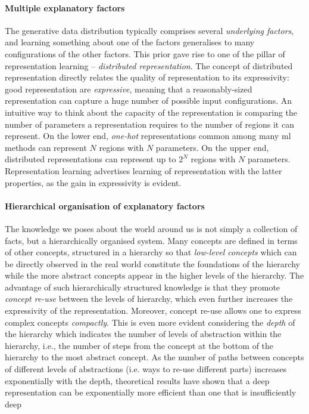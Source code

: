 \paragraph{\textbf{Multiple explanatory factors}} 
The generative data distribution typically comprises several \textit{underlying factors}, and learning something about one of the factors generalises to many configurations of the other factors.
This prior gave rise to one of the pillar of representation learning -- \textit{distributed representation}.
The concept of distributed representation directly relates the quality of representation to its expressivity: good representation are \textit{expressive}, meaning that a reasonably-sized representation can capture a huge number of possible input configurations.
An intuitive way to think about the capacity of the representation is comparing the number of parameters a representation requires to the number of regions it can represent.
On the lower end, \textit{one-hot} representations common among many \gls{ml} methods can represent $N$ regions with $N$ parameters.
On the upper end, distributed representations can represent up to $2^N$ regions with $N$ parameters.
Representation learning advertises learning of representation with the latter properties, as the gain in expressivity is evident.



\paragraph{\textbf{Hierarchical organisation of explanatory factors}}
The knowledge we poses about the world around us is not simply a collection of facts, but a hierarchically organised system.
Many concepts are defined in terms of other concepts, structured in a hierarchy so that \textit{low-level concepts} which can be directly observed in the real world constitute the foundations of the hierarchy while the more abstract concepts appear in the higher levels of the hierarchy.
The advantage of such hierarchically structured knowledge is that they promote \textit{concept re-use} between the levels of hierarchy, which even further increases the expressivity of the representation.
Moreover, concept re-use allows one to express complex concepts \textit{compactly}.
This is even more evident considering the \textit{depth} of the hierarchy which indicates the number of levels of abstraction within the hierarchy, i.e., the number of steps from the concept at the bottom of the hierarchy to the most abstract concept.
As the number of paths between concepts of different levels of abstractions (i.e. ways to re-use different parts) increases exponentially with the depth, theoretical results have shown that a deep representation can be exponentially more efficient than one that is insufficiently deep \cite{Hastad:1986:AOL:12130.12132,89582,Bengio:2011:EPD:2050345.2050349}





